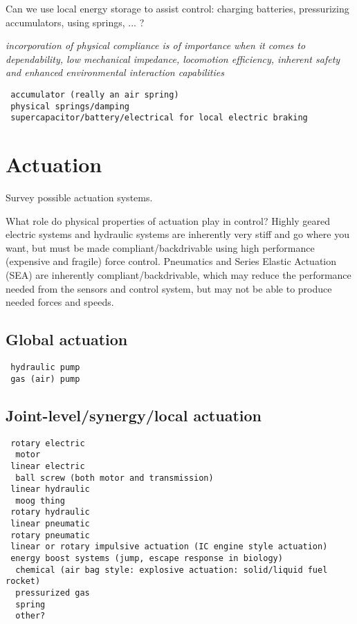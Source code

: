 \documentclass[letterpaper,12pt,fullpage]{article}
\begin{document}
Can we use local energy storage to assist control: charging batteries,
pressurizing accumulators, using springs, ... ?

{\it incorporation of physical
compliance is of importance when it comes to dependability,
low mechanical impedance, locomotion efficiency, inherent
safety and enhanced environmental interaction capabilities}~\cite{IEEE07139975}

\begin{verbatim}
 accumulator (really an air spring)
 physical springs/damping
 supercapacitor/battery/electrical for local electric braking
\end{verbatim}

\section{Actuation}

Survey possible actuation systems.

What role do physical properties of actuation play in control? Highly
geared electric systems and hydraulic systems are inherently very
stiff and go where you want, but must be made compliant/backdrivable
using high performance (expensive and fragile) force control.
Pneumatics and Series Elastic Actuation (SEA) are inherently
compliant/backdrivable, which may reduce the performance
needed from the sensors and control system, but may not be able to
produce needed forces and speeds.

\subsection{Global actuation}

\begin{verbatim}
 hydraulic pump 
 gas (air) pump
\end{verbatim}

\subsection{Joint-level/synergy/local actuation}

\begin{verbatim}
 rotary electric
  motor
 linear electric
  ball screw (both motor and transmission)
 linear hydraulic
  moog thing
 rotary hydraulic
 linear pneumatic
 rotary pneumatic
 linear or rotary impulsive actuation (IC engine style actuation)
 energy boost systems (jump, escape response in biology)
  chemical (air bag style: explosive actuation: solid/liquid fuel rocket)
  pressurized gas
  spring
  other?
\end{verbatim}
\end{document}
